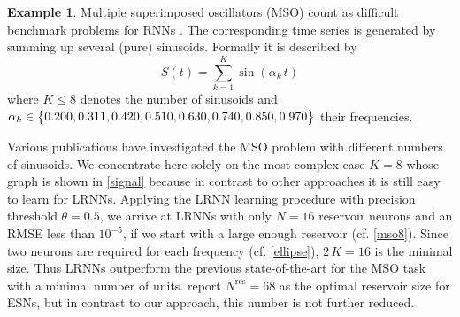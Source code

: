 \documentclass[twoside,11pt]{article}
\theoremstyle{definition}
\newtheorem{exmp}{Example}
\begin{document}
\begin{exmp}\label{exmp}
Multiple superimposed oscillators (MSO) count as difficult benchmark problems
for RNNs \citep{KLB12,SW+07}. The corresponding time
series is generated by summing up several (pure) sinusoids. Formally
it is described by
	\[ S(t) = \sum\limits_{k=1}^K \sin(\alpha_k\,t) \]
where $K \le 8$ denotes the number of sinusoids and $\alpha_k \in \big\{ 0.200,
0.311, 0.420, 0.510, 0.630,\linebreak 0.740, 0.850, 0.970 \big\}$ their frequencies.
\end{exmp}

Various publications have investigated the MSO problem with different numbers of
sinusoids. We concentrate here solely on the most complex case $K=8$ whose graph
is shown in \cref{signal} because in contrast to other approaches it is still
easy to learn for LRNNs.
Applying the LRNN learning procedure with precision threshold $\theta = 0.5$,
we arrive at LRNNs with only $N=16$ reservoir neurons and an RMSE less than
$10^{-5}$, if we start with a large enough reservoir (cf. \cref{mso8}). Since
two neurons are required for each frequency (cf. \cref{ellipse}), $2\,K=16$ is
the minimal size. Thus LRNNs outperform the previous state-of-the-art for the
MSO task with a minimal number of units. \citet{KLB12} report $N^\mathrm{res} =
68$ as the optimal reservoir size for ESNs, but in contrast to our approach,
this number is not further reduced.
\end{document}
